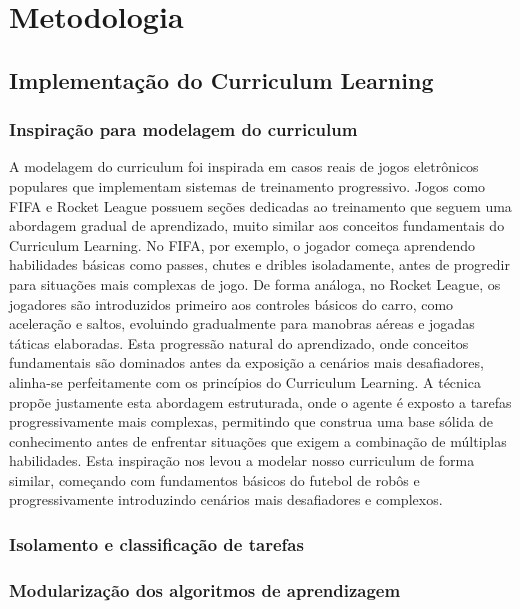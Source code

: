 \chapter{Metodologia}
\label{cap:metodologia}

\section{Implementação do Curriculum Learning}

\subsection{Inspiração para modelagem do curriculum}

A modelagem do curriculum foi inspirada em casos reais de jogos eletrônicos populares que implementam sistemas de treinamento progressivo. Jogos como FIFA e Rocket League possuem seções dedicadas ao treinamento que seguem uma abordagem gradual de aprendizado, muito similar aos conceitos fundamentais do Curriculum Learning. No FIFA, por exemplo, o jogador começa aprendendo habilidades básicas como passes, chutes e dribles isoladamente, antes de progredir para situações mais complexas de jogo. De forma análoga, no Rocket League, os jogadores são introduzidos primeiro aos controles básicos do carro, como aceleração e saltos, evoluindo gradualmente para manobras aéreas e jogadas táticas elaboradas. Esta progressão natural do aprendizado, onde conceitos fundamentais são dominados antes da exposição a cenários mais desafiadores, alinha-se perfeitamente com os princípios do Curriculum Learning. A técnica propõe justamente esta abordagem estruturada, onde o agente é exposto a tarefas progressivamente mais complexas, permitindo que construa uma base sólida de conhecimento antes de enfrentar situações que exigem a combinação de múltiplas habilidades. Esta inspiração nos levou a modelar nosso curriculum de forma similar, começando com fundamentos básicos do futebol de robôs e progressivamente introduzindo cenários mais desafiadores e complexos.

\subsection{Isolamento e classificação de tarefas}

\subsection{Modularização dos algoritmos de aprendizagem}



